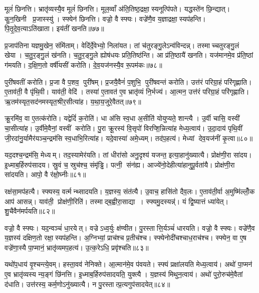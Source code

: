 मूलं॑ छिनत्ति। भ्रातृ॑व्यस्यै॒व मूलं॑ छिनत्ति। मूल॒व्वाँ अ॑ति॒तिष्ठ॒द्रक्षा॒स्यनूत्पि॑पते। यद्धस्ते॑न छि॒न्द्यात्। कु॒न॒खिनी प्र॒जास्स्यु॑। स्फ्येन॑ छिनत्ति। वज्रो॒ वै स्फ्यः। वज्रे॑णै॒व य॒ज्ञाद्रक्षा॒स्यप॑हन्ति। पि॒तृ॒दे॒व॒त्याऽति॑खाता। इय॑तीं खनति॥७७॥

प्र॒जाप॑तिना यज्ञमु॒खेन॒ संमि॑ताम्। वेदि॑र्दे॒वेभ्यो॒ निला॑यत। तां च॑तुरङ्गु॒लेऽन्व॑विन्दन्न्। तस्माच्चतुरङ्गु॒लं खेया। च॒तु॒र॒ङ्गु॒लं ख॑नति। च॒तु॒र॒ङ्गु॒ले ह्योष॑धयः प्रति॒तिष्ठ॑न्ति। आ प्र॑ति॒ष्ठायै॑ खनति। यज॑मानमे॒व प्र॑ति॒ष्ठां ग॑मयति। द॒क्षि॒ण॒तो वर्\mbox{}षी॑यसीं करोति। दे॒व॒यज॑नस्यै॒व रू॒पम॑कः॥७८॥

पुरी॑षवतीं करोति। प्र॒जा वै प॒शव॒ पुरी॑षम्। प्र॒जयै॒वैनं॑ प॒शुभि॒ पुरी॑षवन्तं करोति। उत्त॑रं परिग्रा॒हं परि॑गृह्णाति। ए॒ताव॑ती॒ वै पृ॑थि॒वी। याव॑ती॒ वेदि॑। तस्या॑ ए॒तावत॑ ए॒व भ्रातृ॑व्यं नि॒र्भज्य॑। आ॒त्मन॒ उत्त॑रं परिग्रा॒हं परि॑गृह्णाति। ऋ॒तम॑स्यृत॒सद॑नमस्यृत॒श्रीर॒सीत्या॑ह। य॒था॒य॒जुरे॒वैतत्॥७९॥

क्रू॒रमि॑व॒ वा ए॒तत्क॑रोति। यद्वेदिं॑ क॒रोति॑। धा अ॑सि स्व॒धा अ॒सीति॑ योयुप्यते॒ शान्त्यै। उ॒र्वी चासि॒ वस्वी॑ चा॒सीत्या॑ह। उ॒र्वीमे॒वैनां॒ वस्वीं करोति। पु॒रा क्रू॒रस्य॑ वि॒सृपो॑ विरप्शि॒न्नित्या॑ह मेध्य॒त्वाय॑। उ॒दा॒दाय॑ पृथि॒वीं जी॒रदा॑नु॒र्यामैर॑यञ्च॒न्द्रम॑सि स्व॒धाभि॒रित्या॑ह। यदे॒वास्या॑ अमे॒ध्यम्। तद॑प॒हत्य॑। मेध्यां देव॒यज॑नीं कृ॒त्वा॥८०॥

यद॒दश्च॒न्द्रम॑सि॒ मेध्यम्। तद॒स्यामेर॑यति। तां धीरा॑सो अनु॒दृश्य॑ यजन्त॒ इत्या॒हानु॑ख्यात्यै। प्रोक्ष॑णी॒रा सा॑दय। इ॒ध्माब॒र्\mbox{}हिरुप॑सादय। स्रु॒वं च॒ स्रुच॑श्च॒ संमृ॑ड्ढि। पत्नी॒ संन॑ह्य। आज्ये॑नो॒देहीत्या॑हानुपू॒र्वता॑यै। प्रोक्ष॑णी॒रा सा॑दयति। आपो॒ वै र॑क्षो॒घ्नीः॥८१॥

रक्ष॑सा॒मप॑हत्यै। स्फ्यस्य॒ वर्त्मन्थ्सादयति। य॒ज्ञस्य॒ संत॑त्यै। उ॒वाच॒ हासि॑तो दैव॒लः। ए॒ताव॑ती॒र्वा अ॒मुष्मि॑ल्लोँ॒क आप॑ आसन्न्। याव॑ती॒ प्रोक्ष॑णी॒रिति॑। तस्माद्ब॒ह्वीरा॒साद्या। स्फ्यमु॒दस्यन्न्॑। यं द्वि॒ष्यात्तं ध्या॑येत्। शु॒चैवैन॑मर्पयति॥८२॥

वज्रो॒ वै स्फ्यः। यद॒न्वञ्चं॑ धा॒रयेत्। वज्रेऽध्व॒र्युः क्ष॑ण्वीत। पु॒रस्तात्ति॒र्यञ्चं॑ धारयति। वज्रो॒ वै स्फ्यः। वज्रे॑णै॒व य॒ज्ञस्य॑ दक्षिण॒तो रक्षा॒स्यप॑हन्ति। अ॒ग्निभ्यां॒ प्राच॑श्च प्र॒तीच॑श्च। स्फ्येनोदी॑चश्चाध॒राच॑श्च। स्फ्येन॒ वा ए॒ष वज्रे॑णा॒स्यै पा॒प्मानं॒ भ्रातृ॑व्यमप॒हत्य॑। उ॒त्क॒रेऽधि॒ प्रवृ॑श्चति॥८३॥

यथो॑प॒धाय॑ वृ॒श्चन्त्ये॒वम्। हस्ता॒वव॑ नेनिक्ते। आ॒त्मान॑मे॒व प॑वयते। स्फ्यं प्रक्षा॑लयति मेध्य॒त्वाय॑। अथो॑ पा॒प्मन॑ ए॒व भ्रातृ॑व्यस्य न्य॒ङ्गं छि॑नत्ति। इ॒ध्माब॒र्\mbox{}हिरुप॑सादयति॒ युक्त्यै। य॒ज्ञस्य॑ मिथुन॒त्वाय॑। अथो॑ पुरो॒रुच॑मे॒वैतां द॑धाति। उत्त॑रस्य॒ कर्म॒णोऽनु॑ख्यात्यै। न पु॒रस्तात्प्र॒त्यगुप॑सादयेत्॥८४॥

